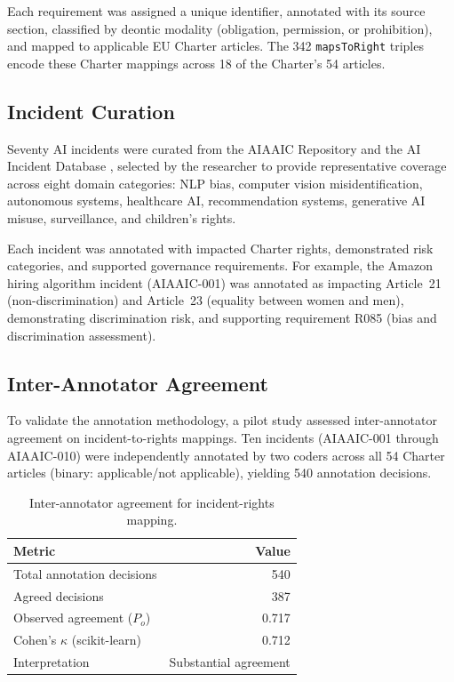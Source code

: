 Each requirement was assigned a unique identifier, annotated with its source section, classified by deontic modality (obligation, permission, or prohibition), and mapped to applicable EU Charter articles. The 342 \texttt{mapsToRight} triples encode these Charter mappings across 18 of the Charter's 54 articles.


\subsection{Incident Curation}

Seventy AI incidents were curated from the AIAAIC Repository \cite{aiaaic2024} and the AI Incident Database \cite{aiid2024}, selected by the researcher to provide representative coverage across eight domain categories: NLP bias, computer vision misidentification, autonomous systems, healthcare AI, recommendation systems, generative AI misuse, surveillance, and children's rights.

Each incident was annotated with impacted Charter rights, demonstrated risk categories, and supported governance requirements. For example, the Amazon hiring algorithm incident (AIAAIC-001) was annotated as impacting Article~21 (non-discrimination) and Article~23 (equality between women and men), demonstrating discrimination risk, and supporting requirement R085 (bias and discrimination assessment).


\subsection{Inter-Annotator Agreement}

To validate the annotation methodology, a pilot study assessed inter-annotator agreement on incident-to-rights mappings. Ten incidents (AIAAIC-001 through AIAAIC-010) were independently annotated by two coders across all 54 Charter articles (binary: applicable/not applicable), yielding 540 annotation decisions.

\begin{table}[htbp]
\centering
\caption{Inter-annotator agreement for incident-rights mapping.}
\label{tab:kappa}
\begin{tabular}{lr}
\toprule
\textbf{Metric} & \textbf{Value} \\
\midrule
Total annotation decisions & 540 \\
Agreed decisions & 387 \\
Observed agreement ($P_o$) & 0.717 \\
Cohen's $\kappa$ (scikit-learn) & 0.712 \\
Interpretation & Substantial agreement \\
\bottomrule
\end{tabular}
\end{table}

